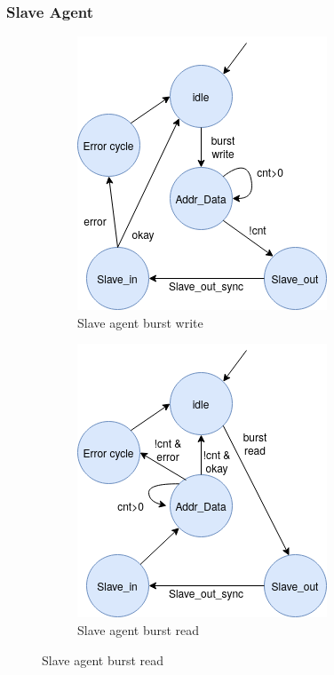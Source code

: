 \subsubsection{Slave Agent}
\begin{figure}[hbt]
 \centering
 \begin{subfigure}[b]{0.4\linewidth}
 \includegraphics[width=0.7\linewidth]{figs/hw/sAgent_wburstfsm.png}
 \caption{Slave agent burst write}
 \end{subfigure}
 \begin{subfigure}[b]{0.4\linewidth}
 \includegraphics[width=0.7\linewidth]{figs/hw/sAgent_rburstfsm.png}
 \caption{Slave agent burst read}
 \end{subfigure}
\label{fig:sagt-burstfsm}
\end{figure}


